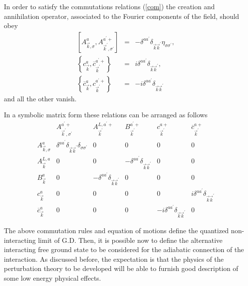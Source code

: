 \documentclass[12pt,letterpaper]{report}
\begin{document}
In order to satisfy the commutations relations (\ref{com}) the
creation and annihilation operator, associated to the Fourier
components of the field, should obey
\begin{eqnarray}
\left[ A_{\vec{k},\sigma }^a,A_{\vec{k}^{\prime },\sigma ^{\prime
}}^{a^{\prime }+}\right] &=&-\delta ^{aa^{\prime }}\delta
_{\vec{k}\vec{k} ^{\prime }}\eta _{\sigma \sigma ^{\prime }},
\nonumber \\ \left\{ c_{\vec{k}}^a,\overline{c}_{\vec{k}^{\prime
}}^{a^{\prime }+}\right\} &=&i\delta ^{aa^{\prime }}\delta
_{\vec{k}\vec{k}^{\prime }}, \nonumber \\ \left\{
\overline{c}_{\vec{k}}^a,c_{\vec{k}^{\prime }}^{a^{\prime
}+}\right\} &=&-i\delta ^{aa^{\prime }}\delta
_{\vec{k}\vec{k}^{\prime }}
\end{eqnarray}
and all the other vanish.

In a symbolic matrix form these relations can be arranged as
follows
\begin{equation}
\begin{array}{cccccc}
& A_{\vec{k}^{\prime },\sigma ^{\prime }}^{a^{\prime }+} &
A_{\vec{k} ^{\prime }}^{L,a^{\prime }+} & B_{\vec{k}^{\prime
}}^{a^{\prime }+} & c_{ \vec{k}^{\prime }}^{a+} &
\overline{c}_{\vec{k}^{\prime }}^{a+} \\ A_{\vec{k},\sigma }^a &
\delta ^{aa^{\prime }}\delta _{\vec{k}\vec{k} ^{\prime }}\delta
_{\sigma \sigma ^{\prime }} & 0 & 0 & 0 & 0 \\ A_{\vec{k}}^{L,a} &
0 & 0 & -\delta ^{aa^{\prime }}\delta _{\vec{k}\vec{k} ^{\prime }}
& 0 & 0 \\ B_{\vec{k}}^a & 0 & -\delta ^{aa^{\prime }}\delta
_{\vec{k}\vec{k}^{\prime }} & 0 & 0 & 0 \\ c_{\vec{k}}^a & 0 & 0 &
0 & 0 & i\delta ^{aa^{\prime }}\delta _{\vec{k}\vec{k }^{\prime }}
\\ \overline{c}_{\vec{k}}^a & 0 & 0 & 0 & -i\delta ^{aa^{\prime
}}\delta _{\vec{ k}\vec{k}^{\prime }} & 0
\end{array}
\label{commu}
\end{equation}

The above commutation rules and equation of motions define the
quantized non-interacting limit of G.D. Then, it is possible now
to define the alternative interacting free ground state to be
considered for the adiabatic connection of the interaction. As
discussed before, the expectation is that the physics of the
perturbation theory to be developed will be able to furnish good
description of some low energy physical effects.
\end{document}
